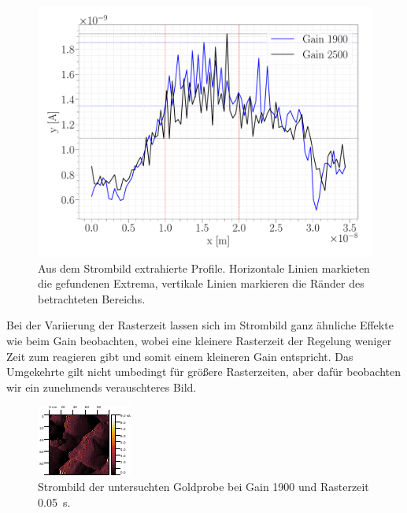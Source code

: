 \begin{figure}[H]
\centering
\includegraphics[width=\textwidth]{../Figures/GAIN_I_forward_profiles.pdf}
\caption{Aus dem Strombild extrahierte Profile. Horizontale Linien markieten die gefundenen Extrema, vertikale Linien markieren die Ränder des betrachteten Bereichs.}
\label{GAIN_I_forward_profiles}
\end{figure}

Bei der Variierung der Rasterzeit lassen sich im Strombild ganz ähnliche Effekte wie beim Gain beobachten, wobei eine kleinere Rasterzeit der Regelung weniger Zeit zum reagieren gibt und somit einem kleineren Gain entspricht. Das Umgekehrte gilt nicht umbedingt für größere Rasterzeiten, aber dafür beobachten wir ein zunehmends verauschteres Bild.

\begin{figure}[H]
\centering
\includegraphics[width=\textwidth]{../Gwyddion/Gold/TIME_005_I_forward.pdf}
\caption{Strombild der untersuchten Goldprobe bei Gain 1900 und Rasterzeit \SI{0.05}{s}.}
\label{TIME_005_I}
\end{figure}

